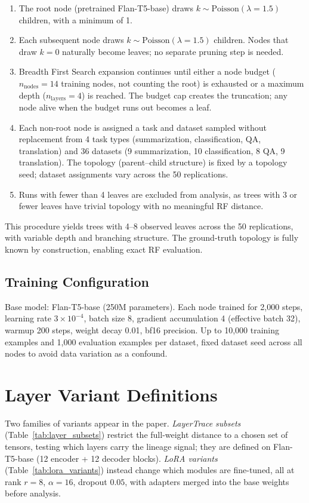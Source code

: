 \documentclass{article}
\theoremstyle{definition}
\theoremstyle{plain}
\begin{document}
\begin{enumerate}
    \item The root node (pretrained Flan-T5-base) draws $k \sim \mathrm{Poisson}(\lambda = 1.5)$ children, with a minimum of 1.
    \item Each subsequent node draws $k \sim \mathrm{Poisson}(\lambda = 1.5)$ children. Nodes that draw $k = 0$ naturally become leaves; no separate pruning step is needed.
    \item Breadth First Search expansion continues until either a node budget ($n_\mathrm{nodes} = 14$ training nodes, not counting the root) is exhausted or a maximum depth ($n_\mathrm{layers} = 4$) is reached. The budget cap creates the truncation; any node alive when the budget runs out becomes a leaf.
    \item Each non-root node is assigned a task and dataset sampled without replacement from 4 task types (summarization, classification, QA, translation) and 36 datasets (9 summarization, 10 classification, 8 QA, 9 translation). The topology (parent--child structure) is fixed by a topology seed; dataset assignments vary across the 50 replications.
    \item Runs with fewer than 4 leaves are excluded from analysis, as trees with 3 or fewer leaves have trivial topology with no meaningful RF distance.
\end{enumerate}

This procedure yields trees with 4--8 observed leaves across the 50 replications, with variable depth and branching structure. The ground-truth topology is fully known by construction, enabling exact RF evaluation.

\subsection*{Training Configuration}
Base model: Flan-T5-base (250M parameters). Each node trained for 2,000 steps, learning rate $3 \times 10^{-4}$, batch size 8, gradient accumulation 4 (effective batch 32), warmup 200 steps, weight decay 0.01, bf16 precision. Up to 10,000 training examples and 1,000 evaluation examples per dataset, fixed dataset seed across all nodes to avoid data variation as a confound.

\section{Layer Variant Definitions}
\label{app:layers}
Two families of variants appear in the paper. \emph{LayerTrace subsets} (Table~\ref{tab:layer_subsets})
restrict the full-weight distance to a chosen set of tensors, testing which layers carry the lineage
signal; they are defined on Flan-T5-base (12 encoder + 12 decoder blocks). \emph{LoRA variants}
(Table~\ref{tab:lora_variants}) instead change which modules are fine-tuned, all at rank $r=8$,
$\alpha=16$, dropout $0.05$, with adapters merged into the base weights before analysis.
\end{document}
